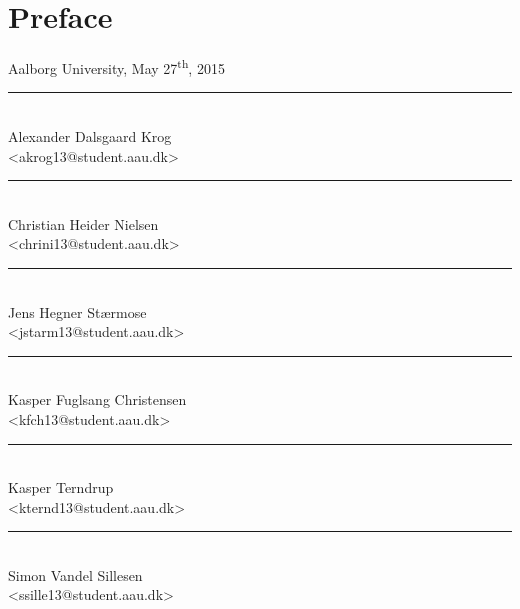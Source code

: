 \chapter{Preface}\label{ch:preface}

\vspace{\baselineskip}\hfill Aalborg University, May 27\textsuperscript{th}, 2015
\vfill

\noindent
\begin{minipage}[b]{0.45\textwidth}
 \centering
 \rule{\textwidth}{0.5pt}\\
  Alexander Dalsgaard Krog\\
 {\footnotesize <akrog13@student.aau.dk>}
\end{minipage}
%
\hfill
%
\begin{minipage}[b]{0.45\textwidth}
 \centering
 \rule{\textwidth}{0.5pt}\\
  Christian Heider Nielsen\\
 {\footnotesize <chrini13@student.aau.dk>}
\end{minipage}
%
\vspace{3\baselineskip}

\noindent
\begin{minipage}[b]{0.45\textwidth}
 \centering
 \rule{\textwidth}{0.5pt}\\
 Jens Hegner Stærmose\\
 {\footnotesize <jstarm13@student.aau.dk>}
\end{minipage}
%
\hfill
%
\begin{minipage}[b]{0.45\textwidth}
 \centering
 \rule{\textwidth}{0.5pt}\\
  Kasper Fuglsang Christensen\\
 {\footnotesize <kfch13@student.aau.dk>}
\end{minipage}
\vspace{3\baselineskip}

\noindent
\begin{minipage}[b]{0.45\textwidth}
 \centering
 \rule{\textwidth}{0.5pt}\\
 Kasper Terndrup\\
 {\footnotesize <kternd13@student.aau.dk>}
\end{minipage}
\hfill
\begin{minipage}[b]{0.45\textwidth}
 \centering
 \rule{\textwidth}{0.5pt}\\
  Simon Vandel Sillesen\\
 {\footnotesize <ssille13@student.aau.dk>}
\end{minipage}
\vspace{3\baselineskip}
